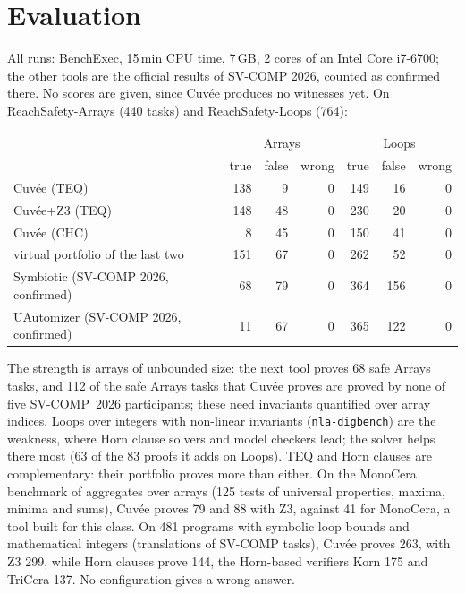\documentclass[a4paper,11pt]{article}
\newcommand{\cuvee}{Cuvée}
\begin{document}
\section{Evaluation}

All runs: BenchExec, 15\,min CPU time, 7\,GB, 2 cores of an Intel Core i7-6700; the other tools are the official
results of SV-COMP 2026, counted as confirmed there. No scores are given, since \cuvee{} produces no witnesses yet.
On ReachSafety-Arrays (440 tasks) and ReachSafety-Loops (764):

\begin{center}\small
\begin{tabular}{l|rrr|rrr}
\toprule
& \multicolumn{3}{c|}{Arrays} & \multicolumn{3}{c}{Loops} \\
& true & false & wrong & true & false & wrong \\
\midrule
\cuvee{} (TEQ) & 138 & 9 & 0 & 149 & 16 & 0 \\
\cuvee{}+Z3 (TEQ) & 148 & 48 & 0 & 230 & 20 & 0 \\
\cuvee{} (CHC) & 8 & 45 & 0 & 150 & 41 & 0 \\
virtual portfolio of the last two & 151 & 67 & 0 & 262 & 52 & 0 \\
\midrule
Symbiotic (SV-COMP 2026, confirmed) & 68 & 79 & 0 & 364 & 156 & 0 \\
UAutomizer (SV-COMP 2026, confirmed) & 11 & 67 & 0 & 365 & 122 & 0 \\
\bottomrule
\end{tabular}
\end{center}

The strength is arrays of unbounded size: the next tool proves 68 safe Arrays tasks, and 112 of the safe Arrays
tasks that \cuvee{} proves are proved by none of five SV-COMP~2026 participants; these need invariants quantified
over array indices. Loops over integers with non-linear invariants (\texttt{nla-digbench}) are the weakness, where
Horn clause solvers and model checkers lead; the solver helps there most (63 of the 83 proofs it adds on Loops).
TEQ and Horn clauses are complementary: their portfolio proves more than either. On the MonoCera benchmark of
aggregates over arrays (125 tests of universal properties, maxima, minima and sums), \cuvee{} proves 79 and 88
with Z3, against 41 for MonoCera, a tool built for this class. On 481 programs with symbolic loop bounds and
mathematical integers (translations of SV-COMP tasks), \cuvee{} proves 263, with Z3 299, while Horn clauses prove
144, the Horn-based verifiers Korn 175 and TriCera 137. No configuration gives a wrong answer.
\end{document}
